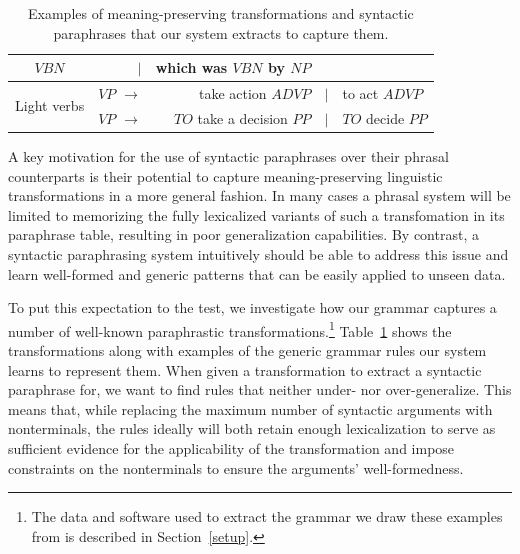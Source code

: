 \documentclass[11pt]{article}
\begin{document}
\begin{table}[!ht]
\begin{center}
\begin{tabular}{|c|rrcl|}
    $\mathit{VBN}$ & $\mid$ & which was $\mathit{VBN}$ by $\mathit{NP}$ \\
    \hline
    \multirow{2}{*}{Light verbs} & $\mathit{VP}$ $\rightarrow$ & take action $\mathit{ADVP}$ &
    $\mid$ & to act $\mathit{ADVP}$ \\
    & $\mathit{VP}$ $\rightarrow$ & $\mathit{TO}$ take a decision $\mathit{PP}$ &
    $\mid$ & $\mathit{TO}$ decide $\mathit{PP}$ \\
    \hline
\end{tabular}
\normalsize
\end{center}
\caption{Examples of meaning-preserving transformations and syntactic
  paraphrases that our system extracts to capture them.}
\label{example_rules}
\end{table}


A key motivation for the use of syntactic paraphrases over their
phrasal counterparts is their potential to capture meaning-preserving
linguistic transformations in a more general fashion. In many cases a
phrasal system will be limited to memorizing the fully lexicalized
variants of such a transfomation in its paraphrase table, resulting in
poor generalization capabilities. By contrast, a syntactic
paraphrasing system intuitively should be able to address this issue
and learn well-formed and generic patterns that can be easily applied
to unseen data.

To put this expectation to the test, we investigate how our grammar
captures a number of well-known paraphrastic
transformations.\footnote{The data and software used to extract the
  grammar we draw these examples from is described in
  Section~\ref{setup}.} Table~\ref{example_rules} shows the
transformations along with examples of the generic grammar rules our
system learns to represent them. When given a transformation to
extract a syntactic paraphrase for, we want to find rules that neither
under- nor over-generalize. This means that, while replacing the
maximum number of syntactic arguments with nonterminals, the rules
ideally will both retain enough lexicalization to serve as sufficient
evidence for the applicability of the transformation and impose
constraints on the nonterminals to ensure the arguments'
well-formedness.
\end{document}
